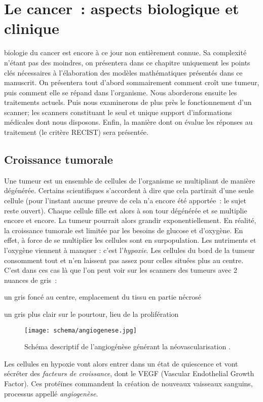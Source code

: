 \documentclass[main.tex]{subfiles}
\begin{document}
\chapter{Le cancer~: aspects biologique et clinique \label{chap:biologie_du_cancer}}
 biologie du cancer est encore à ce jour non entièrement connue. Sa complexité n'étant pas des moindres, on présentera dans ce chapitre uniquement les points clés nécessaires à l'élaboration des modèles mathématiques présentés dans ce manuscrit. On présentera tout d'abord sommairement comment croît une tumeur, puis comment elle se répand dans l'organisme. Nous aborderons ensuite les traitements actuels. Puis nous examinerons de plus près le fonctionnement d'un scanner; les scanners constituant le seul et unique support d'informations médicales dont nous disposons. Enfin, la manière dont on évalue les réponses au traitement (le critère RECIST) sera présentée.

\section{Croissance tumorale}
Une tumeur est un ensemble de cellules de l'organisme se multipliant de manière dégénérée. Certains scientifiques s'accordent à dire que cela partirait d'une seule cellule (pour l'instant aucune preuve de cela n'a encore été apportée~: le sujet reste ouvert). Chaque cellule fille est alors à son tour dégénérée et se multiplie encore et encore. La tumeur pourrait alors grandir exponentiellement. En réalité, la croissance tumorale est limitée par les besoins de glucose et d'oxygène. En effet, à force de se multiplier les cellules sont en surpopulation. Les nutriments et l'oxygène viennent à manquer : c'est l'\emph{hypoxie}. Les cellules du bord de la tumeur consomment tout et n'en laissent pas assez pour celles situées plus au centre. C'est dans ces cas là que l'on peut voir sur les scanners des tumeurs avec 2 nuances de gris~:
\begin{myitemize}
\item un gris foncé au centre, emplacement du tissu en partie nécrosé
\item un gris plus clair sur le pourtour, lieu de la prolifération
\end{myitemize}
\begin{wrapfigure}[18]{R}{.5\textwidth}
\texttt{[image: schema/angiogenese.jpg]}
\caption{\label{fig:schema_angio} Schéma descriptif de l'angiogénèse générant la néovascularisation \cite{webangiogenese}.}
\end{wrapfigure}
Les cellules en hypoxie vont alors entrer dans un état de quiescence et vont sécréter des \emph{facteurs de croissance}, dont le VEGF (Vascular Endothelial Growth Factor). Ces protéïnes commandent la création de nouveaux vaisseaux sanguins, processus appellé \emph{angiogenèse}. 
\end{document}
